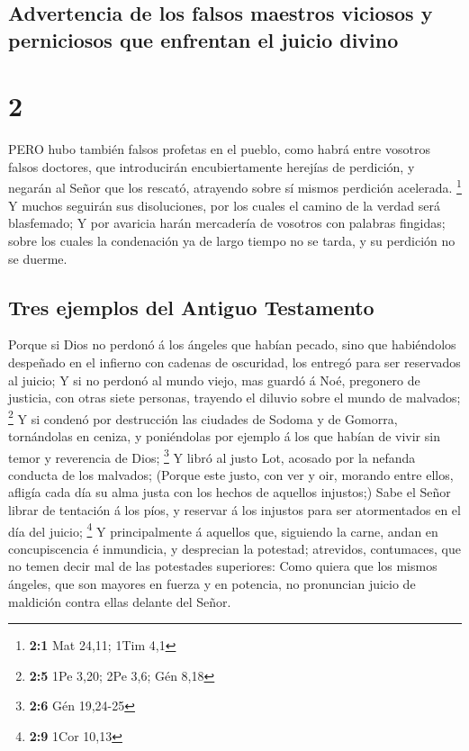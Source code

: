 \hypertarget{advertencia-de-los-falsos-maestros-viciosos-y-perniciosos-que-enfrentan-el-juicio-divino}{%
\subsection{Advertencia de los falsos maestros viciosos y perniciosos
que enfrentan el juicio
divino}\label{advertencia-de-los-falsos-maestros-viciosos-y-perniciosos-que-enfrentan-el-juicio-divino}}

\hypertarget{section-1}{%
\section{2}\label{section-1}}

 PERO hubo también falsos profetas en el pueblo, como habrá
entre vosotros falsos doctores, que introducirán encubiertamente
herejías de perdición, y negarán al Señor que los rescató, atrayendo
sobre sí mismos perdición acelerada. \footnote{\textbf{2:1} Mat 24,11;
  1Tim 4,1}  Y muchos seguirán sus disoluciones, por los
cuales el camino de la verdad será blasfemado;  Y por
avaricia harán mercadería de vosotros con palabras fingidas; sobre los
cuales la condenación ya de largo tiempo no se tarda, y su perdición no
se duerme.

\hypertarget{tres-ejemplos-del-antiguo-testamento}{%
\subsection{Tres ejemplos del Antiguo
Testamento}\label{tres-ejemplos-del-antiguo-testamento}}

 Porque si Dios no perdonó á los ángeles que habían pecado,
sino que habiéndolos despeñado en el infierno con cadenas de oscuridad,
los entregó para ser reservados al juicio;  Y si no perdonó
al mundo viejo, mas guardó á Noé, pregonero de justicia, con otras siete
personas, trayendo el diluvio sobre el mundo de malvados; \footnote{\textbf{2:5}
  1Pe 3,20; 2Pe 3,6; Gén 8,18}  Y si condenó por destrucción
las ciudades de Sodoma y de Gomorra, tornándolas en ceniza, y
poniéndolas por ejemplo á los que habían de vivir sin temor y reverencia
de Dios; \footnote{\textbf{2:6} Gén 19,24-25}  Y libró al
justo Lot, acosado por la nefanda conducta de los malvados; 
(Porque este justo, con ver y oir, morando entre ellos, afligía cada día
su alma justa con los hechos de aquellos injustos;)  Sabe el
Señor librar de tentación á los píos, y reservar á los injustos para ser
atormentados en el día del juicio; \footnote{\textbf{2:9} 1Cor 10,13}
 Y principalmente á aquellos que, siguiendo la carne, andan
en concupiscencia é inmundicia, y desprecian la potestad; atrevidos,
contumaces, que no temen decir mal de las potestades superiores:
 Como quiera que los mismos ángeles, que son mayores en
fuerza y en potencia, no pronuncian juicio de maldición contra ellas
delante del Señor.

